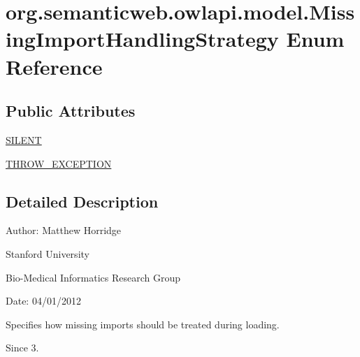\hypertarget{enumorg_1_1semanticweb_1_1owlapi_1_1model_1_1_missing_import_handling_strategy}{\section{org.\-semanticweb.\-owlapi.\-model.\-Missing\-Import\-Handling\-Strategy Enum Reference}
\label{enumorg_1_1semanticweb_1_1owlapi_1_1model_1_1_missing_import_handling_strategy}
}
\subsection*{Public Attributes}
\begin{DoxyCompactItemize}
\item 
\hyperlink{enumorg_1_1semanticweb_1_1owlapi_1_1model_1_1_missing_import_handling_strategy_aed66060ec95dc4ad59ca4dd82509782b}{S\-I\-L\-E\-N\-T}
\item 
\hyperlink{enumorg_1_1semanticweb_1_1owlapi_1_1model_1_1_missing_import_handling_strategy_a28783f8ec58145f2d48186f718570163}{T\-H\-R\-O\-W\-\_\-\-E\-X\-C\-E\-P\-T\-I\-O\-N}
\end{DoxyCompactItemize}


\subsection{Detailed Description}
Author\-: Matthew Horridge\par
 Stanford University\par
 Bio-\/\-Medical Informatics Research Group\par
 Date\-: 04/01/2012 \par
 Specifies how missing imports should be treated during loading. \begin{DoxySince}{Since}
3. 
\end{DoxySince}


